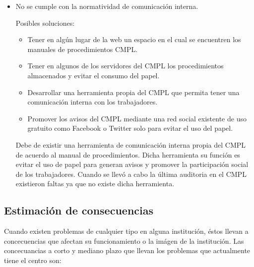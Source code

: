 \begin{itemize}
	\item No se cumple con la normatividad de comunicación interna.
	
	Posibles soluciones:
	\begin{itemize}
		\item Tener en algún lugar de la web un espacio en el cual se encuentren los manuales de procedimientos CMPL.
		\item Tener en algunos de los servidores del CMPL los procedimientos almacenados y evitar el consumo del papel.
		\item Desarrollar una herramienta propia del CMPL que permita tener una comunicación interna con los trabajadores.
		\item Promover los avisos del CMPL mediante una red social existente de uso gratuito como Facebook o Twitter solo para evitar el uso del papel.
	\end{itemize}	
	
Debe de existir una herramienta de comunicación interna propia del CMPL de acuerdo al manual de procedimientos. Dicha herramienta su función es evitar el uso de papel para generan avisos y promover la participación social de los trabajadores. Cuando se llevó a cabo la última auditoria en el CMPL existieron faltas ya que no existe dicha herramienta.
	
\end{itemize}
	\subsection{Estimación de consecuencias}
	Cuando existen problemas de cualquier tipo en alguna institución, éstos llevan a concecuencias que afectan su funcionamiento o la imágen de la institución. Las concecuancias a corto y mediano plazo que llevan los problemas que actualmente tiene el centro son:

